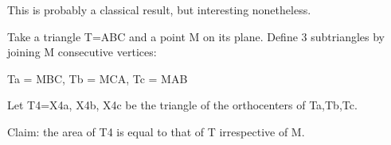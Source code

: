 This is probably a classical result, but interesting nonetheless.

Take a triangle T=ABC and a point M on its plane. Define 3 subtriangles by joining M consecutive vertices:

Ta = MBC, Tb = MCA, Tc = MAB

Let T4={X4a, X4b, X4c} be the triangle of the orthocenters of Ta,Tb,Tc.

Claim: the area of T4 is equal to that of T irrespective of M.